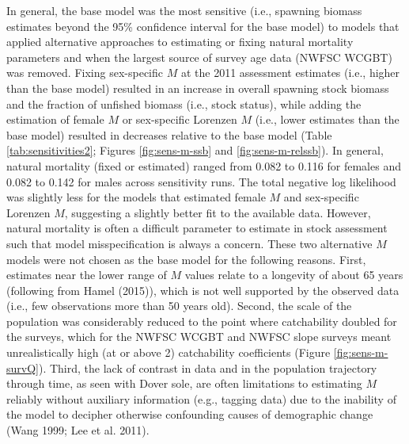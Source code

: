 \documentclass[11pt,
  english,
  a4paper,
]{article}
\begin{document}
In general, the base model was the most sensitive (i.e., spawning biomass estimates beyond the 95\% confidence interval for the base model) to models that applied alternative approaches to estimating or fixing natural mortality parameters and when the largest source of survey age data (NWFSC WCGBT) was removed. Fixing sex-specific {\(M\)\leavevmode\tagmcend\tagstructend} at the 2011 assessment estimates (i.e., higher than the base model) resulted in an increase in overall spawning stock biomass and the fraction of unfished biomass (i.e., stock status), while adding the estimation of female {\(M\)\leavevmode\tagmcend\tagstructend} or sex-specific Lorenzen {\(M\)\leavevmode\tagmcend\tagstructend} (i.e., lower estimates than the base model) resulted in decreases relative to the base model (Table \ref{tab:sensitivities2}; Figures \ref{fig:sens-m-ssb} and \ref{fig:sens-m-relssb}). In general, natural mortality (fixed or estimated) ranged from 0.082 to 0.116 for females and 0.082 to 0.142 for males across sensitivity runs. The total negative log likelihood was slightly less for the models that estimated female {\(M\)\leavevmode\tagmcend\tagstructend} and sex-specific Lorenzen {\(M\)\leavevmode\tagmcend\tagstructend}, suggesting a slightly better fit to the available data. However, natural mortality is often a difficult parameter to estimate in stock assessment such that model misspecification is always a concern. These two alternative {\(M\)\leavevmode\tagmcend\tagstructend} models were not chosen as the base model for the following reasons. First, estimates near the lower range of {\(M\)\leavevmode\tagmcend\tagstructend} values relate to a longevity of about 65 years (following from Hamel {(2015)\leavevmode\tagmcend\tagstructend}), which is not well supported by the observed data (i.e., few observations more than 50 years old). Second, the scale of the population was considerably reduced to the point where catchability doubled for the surveys, which for the NWFSC WCGBT and NWFSC slope surveys meant unrealistically high (at or above 2) catchability coefficients (Figure \ref{fig:sens-m-survQ}). Third, the lack of contrast in data and in the population trajectory through time, as seen with Dover sole, are often limitations to estimating {\(M\)\leavevmode\tagmcend\tagstructend} reliably without auxiliary information (e.g., tagging data) due to the inability of the model to decipher otherwise confounding causes of demographic change {(Wang 1999; Lee et al. 2011)\leavevmode\tagmcend\tagstructend}.
\end{document}
